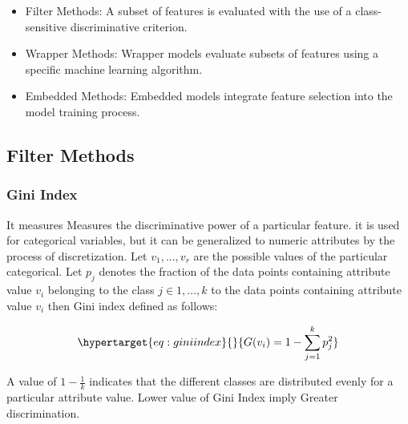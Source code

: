 \documentclass[a4paper,conference]{IEEEtran}
\let\tightlist\relax %
\begin{document}
\begin{itemize}
\tightlist
\item
  Filter Methods: A subset of features is evaluated with the use of a
  class-sensitive discriminative criterion.
\item
  Wrapper Methods: Wrapper models evaluate subsets of features using a
  specific machine learning algorithm.
\item
  Embedded Methods: Embedded models integrate feature selection into the
  model training process.
\end{itemize}

\hypertarget{sec:filter-methods}{%
\subsection{Filter Methods}\label{sec:filter-methods}}

\hypertarget{sec:gini-index}{%
\subsubsection{Gini Index}\label{sec:gini-index}}

It measures Measures the discriminative power of a particular feature.
it is used for categorical variables, but it can be generalized to
numeric attributes by the process of discretization. Let
\(v_1, . . . , v_r\) are the possible values of the particular
categorical. Let \(p_j\) denotes the fraction of the data points
containing attribute value \(v_i\) belonging to the class
\(j \in {1, . . . , k}\) to the data points containing attribute value
\(v_i\) then Gini index defined as follows:

\begin{equation}\protect\hypertarget{eq:giniindex}{}{ G(v_i) = 1 - \sum_{j=1}^{k} p_j^2 }\end{equation}

A value of \(1 - \frac{1}{k}\) indicates that the different classes are
distributed evenly for a particular attribute value. Lower value of Gini
Index imply Greater discrimination.
\end{document}
